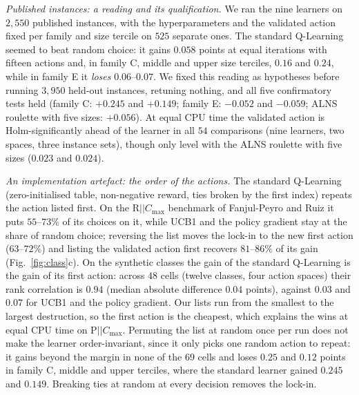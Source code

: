 \documentclass[conference,a4paper]{IEEEtran}
\newcommand{\Cmax}{C_{\max}}
\begin{document}
\emph{Published instances: a reading and its qualification.} We ran the nine learners on $2{,}550$ published instances, with the hyperparameters and the validated action fixed per family and size tercile on $525$ separate ones. The standard Q-Learning seemed to beat random choice: it gains $0.058$ points at equal iterations with fifteen actions and, in family C, middle and upper size terciles, $0.16$ and $0.24$, while in family E it \emph{loses} $0.06$--$0.07$.
We fixed this reading as hypotheses before running $3{,}950$ held-out instances, retuning nothing, and all five confirmatory tests held (family C: $+0.245$ and $+0.149$; family E: $-0.052$ and $-0.059$; ALNS roulette with five sizes: $+0.056$).
At equal CPU time the validated action is Holm-significantly ahead of the learner in all $54$ comparisons (nine learners, two spaces, three instance sets), though only level with the ALNS roulette with five sizes ($0.023$ and $0.024$).

\emph{An implementation artefact: the order of the actions.} The standard Q-Learning (zero-initialised table, non-negative reward, ties broken by the first index) repeats the action listed first. On the R$||\Cmax$ benchmark of Fanjul-Peyro and Ruiz it puts $55$--$73\%$ of its choices on it, while UCB1 and the policy gradient stay at the share of random choice; reversing the list moves the lock-in to the new first action ($63$--$72\%$) and listing the validated action first recovers $81$--$86\%$ of its gain (Fig.~\ref{fig:class}c).
On the synthetic classes the gain of the standard Q-Learning is the gain of its first action: across $48$ cells (twelve classes, four action spaces) their rank correlation is $0.94$ (median absolute difference $0.04$ points), against $0.03$ and $0.07$ for UCB1 and the policy gradient.
Our lists run from the smallest to the largest destruction, so the first action is the cheapest, which explains the wins at equal CPU time on P$||\Cmax$. Permuting the list at random once per run does not make the learner order-invariant, since it only picks one random action to repeat: it gains beyond the margin in none of the $69$ cells and loses $0.25$ and $0.12$ points in family C, middle and upper terciles, where the standard learner gained $0.245$ and $0.149$.
Breaking ties at random at every decision removes the lock-in.
\end{document}
